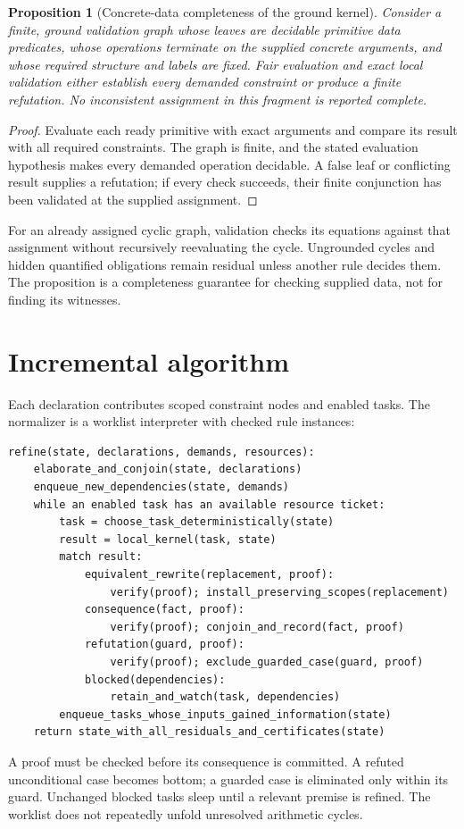 \documentclass[11pt,a4paper,oneside]{report}
\newtheorem{proposition}[definition]{Proposition}
\theoremstyle{remark}
\begin{document}
\begin{proposition}[Concrete-data completeness of the ground kernel]
\label{prop:ground-complete}
Consider a finite, ground validation graph whose leaves are decidable primitive
data predicates, whose operations terminate on the supplied concrete arguments,
and whose required structure and labels are fixed. Fair evaluation and exact
local validation either establish every demanded constraint or produce a finite
refutation. No inconsistent assignment in this fragment is reported complete.
\end{proposition}
\begin{proof}
Evaluate each ready primitive with exact arguments and compare its result with
all required constraints. The graph is finite, and the stated evaluation
hypothesis makes every demanded operation decidable. A false leaf or conflicting
result supplies a refutation; if every check succeeds, their finite conjunction
has been validated at the supplied assignment.
\end{proof}
For an already assigned cyclic graph, validation checks its equations against
that assignment without recursively reevaluating the cycle. Ungrounded cycles
and hidden quantified obligations remain residual unless another rule decides
them. The proposition is a completeness guarantee for checking supplied data,
not for finding its witnesses.

\section{Incremental algorithm}
Each declaration contributes scoped constraint nodes and enabled tasks. The
normalizer is a worklist interpreter with checked rule instances:
\par\noindent\begin{minipage}{\linewidth}
\begin{lstlisting}[language={},basicstyle=\ttfamily\fontsize{8.5}{10.4}\selectfont]
refine(state, declarations, demands, resources):
    elaborate_and_conjoin(state, declarations)
    enqueue_new_dependencies(state, demands)
    while an enabled task has an available resource ticket:
        task = choose_task_deterministically(state)
        result = local_kernel(task, state)
        match result:
            equivalent_rewrite(replacement, proof):
                verify(proof); install_preserving_scopes(replacement)
            consequence(fact, proof):
                verify(proof); conjoin_and_record(fact, proof)
            refutation(guard, proof):
                verify(proof); exclude_guarded_case(guard, proof)
            blocked(dependencies):
                retain_and_watch(task, dependencies)
        enqueue_tasks_whose_inputs_gained_information(state)
    return state_with_all_residuals_and_certificates(state)
\end{lstlisting}
\end{minipage}\par
A proof must be checked before its consequence is committed. A refuted
unconditional case becomes bottom; a guarded case is eliminated only within
its guard. Unchanged blocked tasks sleep until a relevant premise is refined.
The worklist does not repeatedly unfold unresolved arithmetic cycles.
\end{document}
